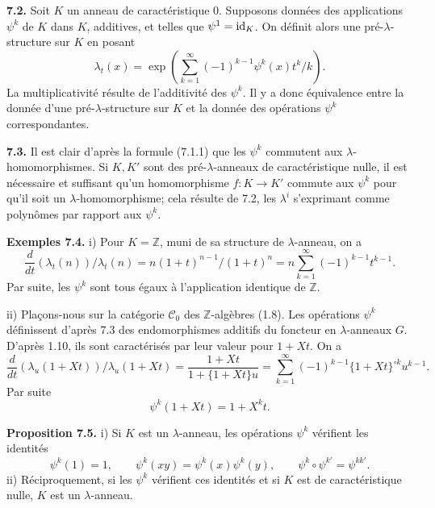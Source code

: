 \documentclass[11pt]{article}
\begin{document}
\textbf{7.2.} Soit \(K\) un anneau de caractéristique \(0\). Supposons données des applications \(\psi^k\) de \(K\) dans \(K\), additives, et telles que \(\psi^1=\operatorname{id}_K\). On définit alors une pré-\(\lambda\)-structure sur \(K\) en posant
\begin{equation}\tag{7.2.1}
  \lambda_t(x)=
  \exp\left(\sum_{k=1}^{\infty}(-1)^{k-1}\psi^k(x)t^k/k\right).
\end{equation}
La multiplicativité résulte de l'additivité des \(\psi^k\). Il y a donc équivalence entre la donnée d'une pré-\(\lambda\)-structure sur \(K\) et la donnée des opérations \(\psi^k\) correspondantes.

\textbf{7.3.} Il est clair d'après la formule (7.1.1) que les \(\psi^k\) commutent aux \(\lambda\)-homomorphismes. Si \(K,K'\) sont des pré-\(\lambda\)-anneaux de caractéristique nulle, il est nécessaire et suffisant qu'un homomorphisme \(f:K\to K'\) commute aux \(\psi^k\) pour qu'il soit un \(\lambda\)-homomorphisme; cela résulte de 7.2, les \(\lambda^i\) s'exprimant comme polynômes par rapport aux \(\psi^k\).

\textbf{Exemples 7.4.} i) Pour \(K=\mathbb Z\), muni de sa structure de \(\lambda\)-anneau, on a
\[
  \frac{d}{dt}(\lambda_t(n))/\lambda_t(n)
  =
  n(1+t)^{n-1}/(1+t)^n
  =
  n\sum_{k=1}^{\infty}(-1)^{k-1}t^{k-1}.
\]
Par suite, les \(\psi^k\) sont tous égaux à l'application identique de \(\mathbb Z\).

ii) Plaçons-nous sur la catégorie \(\mathscr C_0\) des \(\mathbb Z\)-algèbres (1.8). Les opérations \(\psi^k\) définissent d'après 7.3 des endomorphismes additifs du foncteur en \(\lambda\)-anneaux \(G\). D'après 1.10, ils sont caractérisés par leur valeur pour \(1+Xt\). On a
\[
  \frac{d}{dt}(\lambda_u(1+Xt))/\lambda_u(1+Xt)
  =
  \frac{1+Xt}{1+\{1+Xt\}u}
  =
  \sum_{k=1}^{\infty}(-1)^{k-1}\{1+Xt\}^{\circ k}u^{k-1}.
\]
Par suite
\begin{equation}\tag{7.4.1}
  \psi^k(1+Xt)=1+X^k t.
\end{equation}

\textbf{Proposition 7.5.} i) Si \(K\) est un \(\lambda\)-anneau, les opérations \(\psi^k\) vérifient les identités
\begin{equation}\tag{7.5.1}
  \psi^k(1)=1,\qquad
  \psi^k(xy)=\psi^k(x)\psi^k(y),\qquad
  \psi^k\circ\psi^{k'}=\psi^{kk'}.
\end{equation}
ii) Réciproquement, si les \(\psi^k\) vérifient ces identités et si \(K\) est de caractéristique nulle, \(K\) est un \(\lambda\)-anneau.
\end{document}
